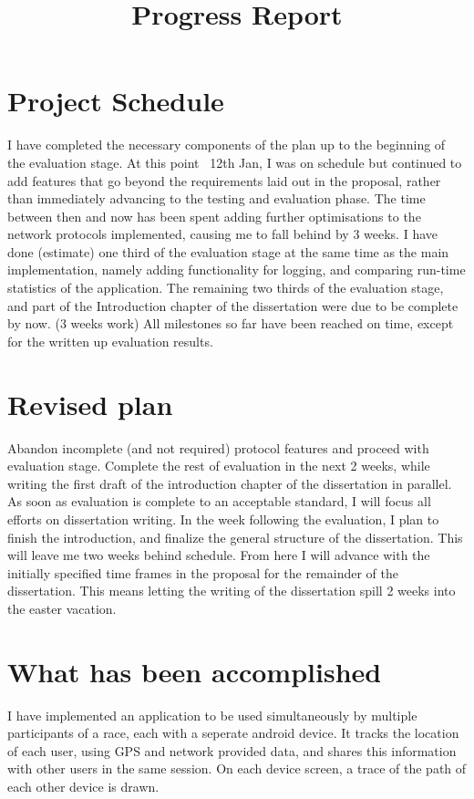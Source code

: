 \documentclass{article}
\begin{document}
\title{Progress Report}
\section{Project Schedule}

I have completed the necessary components of the plan up to the beginning of the evaluation stage.
At this point ~12th Jan, I was on schedule but continued to add features that go beyond the requirements laid out in the proposal, rather than immediately advancing to the testing and evaluation phase. The time between then and now has been spent adding further optimisations to the network protocols implemented, causing me to fall behind by 3 weeks.
I have done (estimate) one third of the evaluation stage at the same time as the main implementation, namely adding functionality for logging, and comparing run-time statistics of the application. The remaining two thirds of the evaluation stage, and part of the Introduction chapter of the dissertation were due to be complete by now. (3 weeks work)
All milestones so far have been reached on time, except for the written up evaluation results.

\section{Revised plan}
Abandon incomplete (and not required) protocol features and proceed with evaluation stage.
Complete the rest of evaluation in the next 2 weeks, while writing the first draft of the introduction chapter of the dissertation in parallel.
As soon as evaluation is complete to an acceptable standard, I will focus all efforts on dissertation writing.
In the week following the evaluation, I plan to finish the introduction, and finalize the general structure of the dissertation.
This will leave me two weeks behind schedule.
From here I will advance with the initially specified time frames in the proposal for the remainder of the dissertation. This means letting the writing of the dissertation spill 2 weeks into the easter vacation.

\section{What has been accomplished}

I have implemented an application to be used simultaneously by multiple participants of a race, each with a seperate android device. It tracks the location of each user, using GPS and network provided data, and shares this information with other users in the same session. On each device screen, a trace of the path of each other device is drawn.
\end{document}
